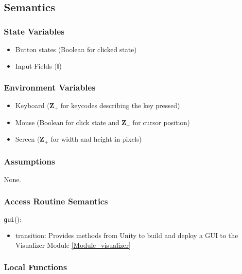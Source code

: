 \documentclass[12pt, titlepage]{article}
\begin{document}
\subsection{Semantics}

\subsubsection{State Variables}

\begin{itemize}
  \item Button states (Boolean for clicked state)
  \item Input Fields ($\mathbb{I}$)
  
\end{itemize}

\subsubsection{Environment Variables}

\begin{itemize}
  \item Keyboard ($\mathbf{Z}_{+}$ for keycodes describing the key pressed)
  \item Mouse (Boolean for click state and  $\mathbf{Z}_{+}$ for cursor position)
  \item Screen ($\mathbf{Z}_{+}$ for width and height in pixels)
\end{itemize}

\subsubsection{Assumptions}

None.

\subsubsection{Access Routine Semantics}

\noindent \texttt{gui}():
\begin{itemize}
\item transition: Provides methods from Unity to build and deploy a GUI to the Visualizer Module \ref{Module_visualizer}
\end{itemize}

\subsubsection{Local Functions}
\end{document}
